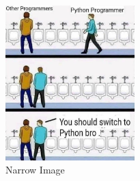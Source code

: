 \documentclass{article}
\begin{document}
\begin{figure}[t]
\centering
\includegraphics[width=5cm]{artifacts/task_2/python_meme.png}
\caption{Narrow Image}
\label{fig:img9}
\end{figure}
\end{document}
